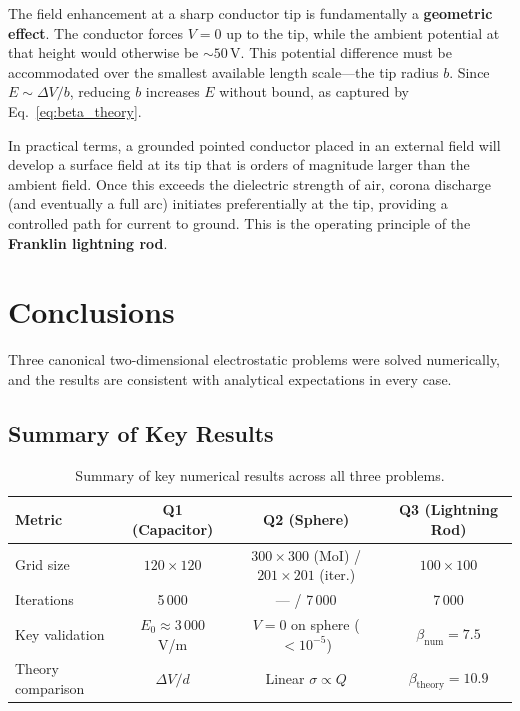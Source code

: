 \documentclass[11pt,a4paper]{article}
\begin{document}
The field enhancement at a sharp conductor tip is fundamentally a \textbf{geometric effect}. The conductor forces $V=0$ up to the tip, while the ambient potential at that height would otherwise be ${\sim}50$\,V. This potential difference must be accommodated over the smallest available length scale---the tip radius $b$. Since $E \sim \Delta V / b$, reducing $b$ increases $E$ without bound, as captured by Eq.~\eqref{eq:beta_theory}.

In practical terms, a grounded pointed conductor placed in an external field will develop a surface field at its tip that is orders of magnitude larger than the ambient field. Once this exceeds the dielectric strength of air, corona discharge (and eventually a full arc) initiates preferentially at the tip, providing a controlled path for current to ground. This is the operating principle of the \textbf{Franklin lightning rod}.

\newpage

\section{Conclusions}

Three canonical two-dimensional electrostatic problems were solved numerically, and the results are consistent with analytical expectations in every case.

\subsection{Summary of Key Results}

\begin{table}[H]
\centering
\small
\renewcommand{\arraystretch}{1.3}
\begin{tabular}{lccc}
\toprule
\textbf{Metric} & \textbf{Q1 (Capacitor)} & \textbf{Q2 (Sphere)} & \textbf{Q3 (Lightning Rod)} \\
\midrule
Grid size          & $120 \times 120$ & $300 \times 300$ (MoI) / $201 \times 201$ (iter.) & $100 \times 100$ \\
Iterations         & 5\,000 & --- / 7\,000 & 7\,000 \\
Key validation     & $E_0 \approx 3\,000$ V/m & $V=0$ on sphere ($<10^{-5}$) & $\beta_{\text{num}} = 7.5$ \\
Theory comparison  & $\Delta V / d$ & Linear $\sigma \propto Q$ & $\beta_{\text{theory}} = 10.9$ \\
\bottomrule
\end{tabular}
\caption{Summary of key numerical results across all three problems.}
\end{table}
\end{document}
